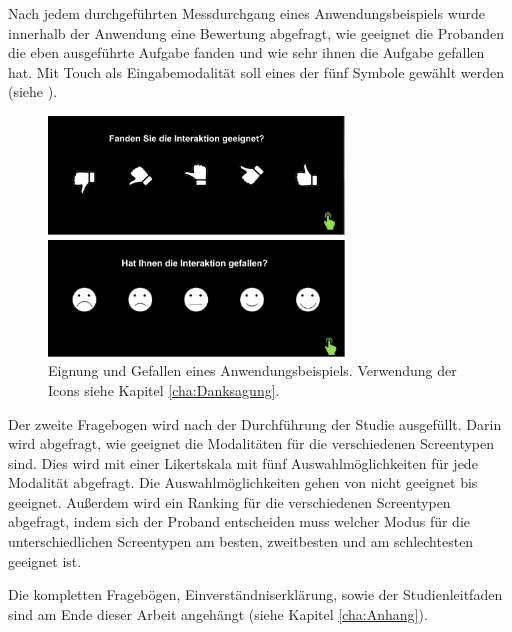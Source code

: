 Nach jedem durchgeführten Messdurchgang eines Anwendungsbeispiels wurde innerhalb der Anwendung eine Bewertung abgefragt, wie geeignet die Probanden die eben ausgeführte Aufgabe fanden und wie sehr ihnen die Aufgabe gefallen hat. 
Mit Touch als Eingabemodalität soll eines der fünf Symbole gewählt werden (siehe ).
\begin{figure}
	\centering
		\includegraphics[width=0.7\textwidth]{img/Smileys.JPG}
	\caption[Eignung und Gefallen eines Anwendungsbeispiels]{Eignung und Gefallen eines Anwendungsbeispiels. Verwendung der Icons siehe Kapitel \ref{cha:Danksagung}.
}
	\label{fig:Smileys}
\end{figure}

Der zweite Fragebogen wird nach der Durchführung der Studie ausgefüllt. 
Darin wird abgefragt, wie geeignet die Modalitäten für die verschiedenen Screentypen sind. 
Dies wird mit einer Likertskala mit fünf Auswahlmöglichkeiten für jede Modalität abgefragt.  
Die Auswahlmöglichkeiten gehen von nicht geeignet bis geeignet. 
Außerdem wird ein Ranking für die verschiedenen Screentypen abgefragt, indem sich der Proband entscheiden muss welcher Modus für die unterschiedlichen Screentypen am besten, zweitbesten und am schlechtesten geeignet ist.  

Die kompletten Fragebögen, Einverständniserklärung, sowie der Studienleitfaden sind am Ende dieser Arbeit angehängt (siehe Kapitel \ref{cha:Anhang}).

